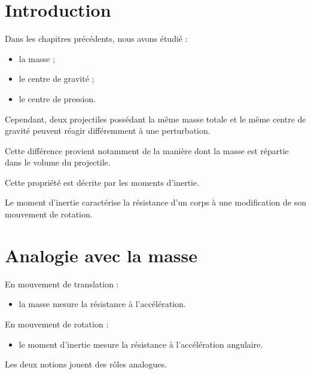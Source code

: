 
\section{Introduction}

Dans les chapitres précédents, nous avons étudié :

\begin{itemize}
    \item la masse ;
    \item le centre de gravité ;
    \item le centre de pression.
\end{itemize}

Cependant, deux projectiles possédant la même masse totale et le même centre
de gravité peuvent réagir différemment à une perturbation.

Cette différence provient notamment de la manière dont la masse est répartie
dans le volume du projectile.

Cette propriété est décrite par les moments d'inertie.

\begin{aretenir}

Le moment d'inertie caractérise la résistance d'un corps à une modification
de son mouvement de rotation.

\end{aretenir}

\section{Analogie avec la masse}

En mouvement de translation :

\begin{itemize}
    \item la masse mesure la résistance à l'accélération.
\end{itemize}

En mouvement de rotation :

\begin{itemize}
    \item le moment d'inertie mesure la résistance à l'accélération
          angulaire.
\end{itemize}

Les deux notions jouent des rôles analogues.


